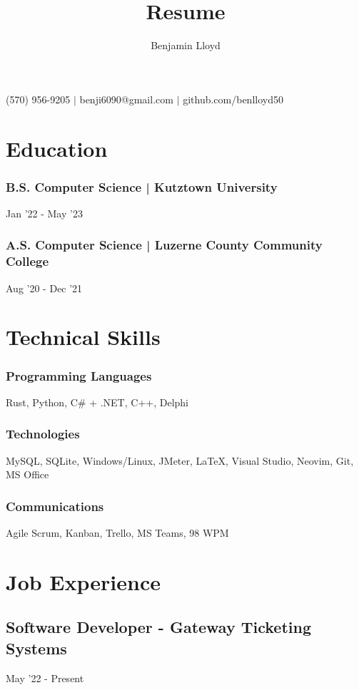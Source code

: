 \documentclass{article}
\makeatletter
\renewcommand{\maketitle}{
\begin{center}
{\huge\bfseries\theauthor}

\vspace{.25em}

{}(570) 956-9205 $\vert$ {}benji6090@gmail.com $\vert$ {}github.com/benlloyd50

\end{center}
}
\makeatother
\begin{document}
\title{Resume}

\author{Benjamin Lloyd}

\maketitle

\section{Education}
\subsubsection{B.S. Computer Science | Kutztown University} \hfill Jan '22 - May '23

\subsubsection{A.S. Computer Science | Luzerne County Community College} \hfill Aug '20 - Dec '21


\section{Technical Skills}

\subsubsection{Programming Languages} Rust, Python, C\# + .NET, C++, Delphi

\subsubsection{Technologies} MySQL, SQLite, Windows/Linux, JMeter, {\LaTeX}, Visual Studio, Neovim, Git, MS Office

\subsubsection{Communications} Agile Scrum, Kanban, Trello, MS Teams,  98 WPM

\section{Job Experience}
\subsection{Software Developer - Gateway Ticketing Systems} \hfill May '22 - Present
\end{document}
